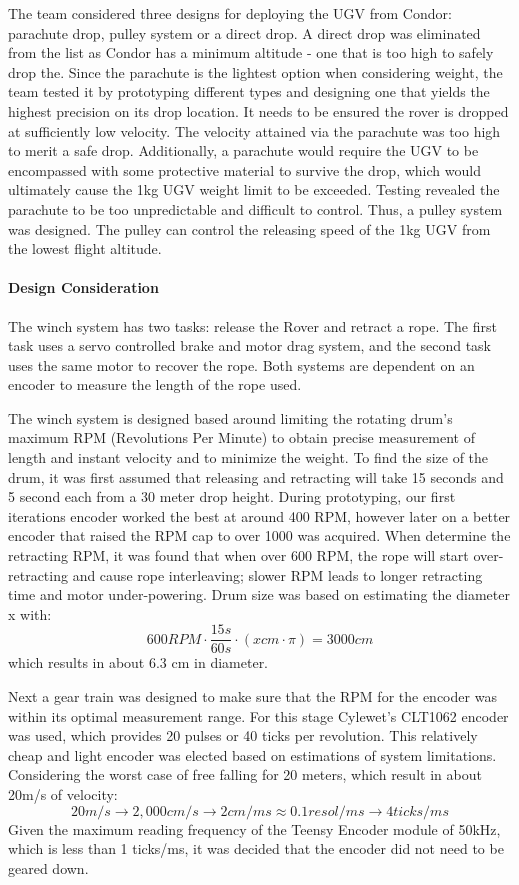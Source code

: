 The team considered three designs for deploying the UGV from Condor: parachute drop, pulley system or a direct drop. A direct drop was eliminated from the list as Condor has a minimum altitude - one that is too high to safely drop the. Since the parachute is the lightest option when considering weight, the team tested it by prototyping different types and designing one that yields the highest precision on its drop location. It needs to be ensured the rover is dropped at sufficiently low velocity. The velocity attained via the parachute was too high to merit a safe drop. Additionally, a parachute would require the UGV to be encompassed with some protective material to survive the drop, which would ultimately cause the 1kg UGV weight limit to be exceeded. Testing revealed the parachute to be too unpredictable and difficult to control. Thus, a pulley system was designed. The pulley can control the releasing speed of the 1kg UGV from the lowest flight altitude.

\paragraph{Design Consideration}
The winch system has two tasks: release the Rover and retract a rope. The first task uses a servo controlled brake and motor drag system, and the second task uses the same motor to recover the rope. Both systems are dependent on an encoder to measure the length of the rope used. %

The winch system is designed based around limiting the rotating drum’s maximum RPM (Revolutions Per Minute) to obtain precise measurement of length and instant velocity and to minimize the weight. To find the size of the drum, it was first assumed that releasing and retracting will take 15 seconds and 5 second each from a 30 meter drop height. During prototyping, our first iterations encoder worked the best at around 400 RPM, however later on a better encoder that raised the RPM cap to over 1000 was acquired. When determine the retracting RPM, it was found that when over 600 RPM, the rope will start over-retracting and cause rope interleaving; slower RPM leads to longer retracting time and motor under-powering. Drum size was based on estimating the diameter x with: $$600 RPM \cdot \frac{15s}{60s} \cdot (x cm \cdot \pi) = 3000 cm$$ which results in about 6.3 cm in diameter. 

Next a gear train was designed to make sure that the RPM for the encoder was within its optimal measurement range. For this stage Cylewet’s CLT1062 encoder was used, which provides 20 pulses or 40 ticks per revolution. This relatively cheap and light encoder was elected based on estimations of system limitations. Considering the worst case of free falling for 20 meters, which result in about 20m/s of velocity:
$$20 m/s \rightarrow 2,000 cm/s \rightarrow 2 cm / ms \approx  0.1 resol/ms \rightarrow 4 ticks/ms$$
Given the maximum reading frequency of the Teensy Encoder module of 50kHz, which is less than 1 ticks/ms, it was decided that the encoder did not need to be geared down.

